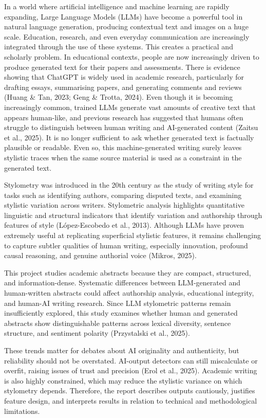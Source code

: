 \documentclass[12pt,a4paper]{article}
\begin{document}
In a world where artificial intelligence and machine learning are rapidly expanding, Large Language Models (LLMs) have become a powerful tool in natural language generation, producing contextual text and images on a huge scale. Education, research, and even everyday communication are increasingly integrated through the use of these systems. This creates a practical and scholarly problem. In educational contexts, people are now increasingly driven to produce generated text for their papers and assessments. There is evidence showing that ChatGPT is widely used in academic research, particularly for drafting essays, summarising papers, and generating comments and reviews (Huang \& Tan, 2023; Geng \& Trotta, 2024). Even though it is becoming increasingly common, trained LLMs generate vast amounts of creative text that appears human-like, and previous research has suggested that humans often struggle to distinguish between human writing and AI-generated content (Zaitsu et al., 2025). It is no longer sufficient to ask whether generated text is factually plausible or readable. Even so, this machine-generated writing surely leaves stylistic traces when the same source material is used as a constraint in the generated text.

Stylometry was introduced in the 20th century as the study of writing style for tasks such as identifying authors, comparing disputed texts, and examining stylistic variation across writers. Stylometric analysis highlights quantitative linguistic and structural indicators that identify variation and authorship through features of style (L\'opez-Escobedo et al., 2013). Although LLMs have proven extremely useful at replicating superficial stylistic features, it remains challenging to capture subtler qualities of human writing, especially innovation, profound causal reasoning, and genuine authorial voice (Mikros, 2025).

This project studies academic abstracts because they are compact, structured, and information-dense. Systematic differences between LLM-generated and human-written abstracts could affect authorship analysis, educational integrity, and human-AI writing research. Since LLM stylometric patterns remain insufficiently explored, this study examines whether human and generated abstracts show distinguishable patterns across lexical diversity, sentence structure, and sentiment polarity (Przystalski et al., 2025).

These trends matter for debates about AI originality and authenticity, but reliability should not be overstated. AI-output detectors can still miscalculate or overfit, raising issues of trust and precision (Erol et al., 2025). Academic writing is also highly constrained, which may reduce the stylistic variance on which stylometry depends. Therefore, the report describes outputs cautiously, justifies feature design, and interprets results in relation to technical and methodological limitations.
\end{document}
